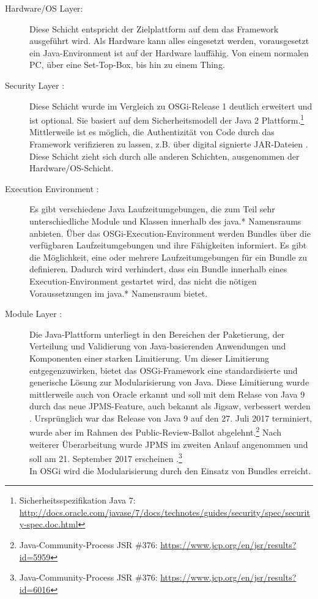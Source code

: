 \begin{description}
 \item [Hardware/OS Layer:]
 Diese Schicht entspricht der Zielplattform auf dem das Framework ausgeführt wird. Als Hardware kann alles eingesetzt werden,  
 vorausgesetzt ein Java-Environment ist auf der Hardware lauffähig. Von einem normalen PC, über eine Set-Top-Box, bis hin zu einem Thing.
 
 \item [Security Layer {\normalfont \cite[S. 17-29]{osgi_r6}}:]
 Diese Schicht wurde im Vergleich zu \ac{OSGi}-Release 1 deutlich erweitert und ist optional. 
 Sie basiert auf dem Sicherheitsmodell der Java 2 Plattform.\footnote{Sicherheitsspezifikation Java 7: \url{http://docs.oracle.com/javase/7/docs/technotes/guides/security/spec/security-spec.doc.html}}
 Mittlerweile ist es möglich, die Authentizität von Code durch das Framework verifizieren zu lassen, z.B. über digital signierte \ac{JAR}-Dateien \cite{osgi_service_platform}. 
 Diese Schicht zieht sich durch alle anderen Schichten, ausgenommen der Hardware/OS-Schicht.
 
 \item[Execution Environment {\normalfont \cite[S. 44-46]{osgi_r6}}:]
 Es gibt verschiedene Java Laufzeitumgebungen, die zum Teil sehr unterschiedliche Module und 
 Klassen innerhalb des java.* Namensraums anbieten. Über das \ac{OSGi}-Execution-Environment werden Bundles über die verfügbaren Laufzeitumgebungen und ihre Fähigkeiten informiert.
 Es gibt die Möglichkeit, eine oder mehrere Laufzeitumgebungen für ein Bundle zu definieren. Dadurch wird verhindert, dass ein Bundle innerhalb eines Execution-Environment gestartet wird, 
 das nicht die nötigen Voraussetzungen im java.* Namensraum bietet.
 
 \item [Module Layer {\normalfont \cite[S. 31-92]{osgi_r6}}:]
 Die Java-Plattform unterliegt in den Bereichen der Paketierung, der Verteilung und Validierung von Java-basierenden Anwendungen und Komponenten
 einer starken Limitierung. Um dieser Limitierung entgegenzuwirken, bietet das \ac{OSGi}-Framework eine standardisierte und generische Lösung zur Modularisierung von Java.
 Diese Limitierung wurde mittlerweile auch von Oracle erkannt und soll mit dem Relase von Java 9 durch das neue \ac{JPMS}-Feature,
 auch bekannt als Jigsaw, verbessert werden \cite{heise_java9}. Ursprünglich war das Release von Java 9 auf den 27. Juli 2017 terminiert, wurde aber im Rahmen des
 Public-Review-Ballot abgelehnt.\footnote{Java-Community-Process JSR \#376: \url{https://www.jcp.org/en/jsr/results?id=5959}}
 Nach weiterer Überarbeitung wurde \ac{JPMS} im zweiten Anlauf angenommen 
 und soll am 21. September 2017 erscheinen \cite{heise_jigsaw}.\footnote{Java-Community-Process JSR \#376: \url{https://www.jcp.org/en/jsr/results?id=6016}}\\
 In \ac{OSGi} wird die Modularisierung durch den Einsatz von Bundles erreicht.
 

\end{description}
